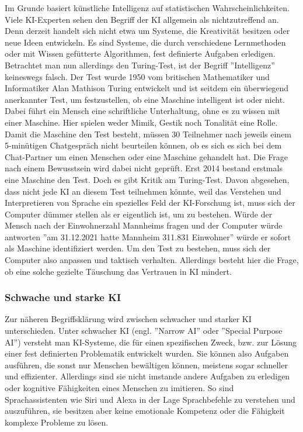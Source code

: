\documentclass[a4paper,12pt, german]{report}
\begin{document}
Im Grunde basiert künstliche Intelligenz auf statistischen Wahrscheinlichkeiten. Viele KI-Experten sehen den Begriff der KI allgemein als nichtzutreffend an. Denn derzeit handelt sich nicht etwa um Systeme, die Kreativität besitzen oder neue Ideen entwickeln. Es sind Systeme, die durch verschiedene Lernmethoden oder mit Wissen gefütterte Algorithmen, fest definierte Aufgaben erledigen. \newline
Betrachtet man nun allerdings den Turing-Test, ist der Begriff ''Intelligenz'' keineswegs falsch. Der Test wurde 1950 vom britischen Mathematiker und Informatiker Alan Mathison Turing entwickelt und ist seitdem ein überwiegend anerkannter Test, um festzustellen, ob eine Maschine intelligent ist oder nicht.
Dabei führt ein Mensch eine schriftliche Unterhaltung, ohne es zu wissen mit einer Maschine. Hier spielen weder Mimik, Gestik noch Tonalität eine Rolle. Damit die Maschine den Test besteht, müssen 30 Teilnehmer nach jeweils einem 5-minütigen Chatgespräch nicht beurteilen können, ob es sich es sich bei dem Chat-Partner um einen Menschen oder eine Maschine gehandelt hat. Die Frage nach einem Bewusstsein wird dabei nicht geprüft. Erst 2014 bestand erstmals eine Maschine den Test. \newline
Doch es gibt Kritik am Turing-Test. Davon abgesehen, dass nicht jede KI an diesem Test teilnehmen könnte, weil das Verstehen und Interpretieren von Sprache ein spezielles Feld der KI-Forschung ist, muss sich der Computer dümmer stellen als er eigentlich ist, um zu bestehen. Würde der Mensch nach der Einwohnerzahl Mannheims fragen und der Computer würde antworten ''am 31.12.2021 hatte Mannheim 311.831 Einwohner'' würde er sofort als Maschine identifiziert werden. Um den Test zu bestehen, muss sich der Computer also anpassen und taktisch verhalten. Allerdings besteht hier die Frage, ob eine solche gezielte Täuschung das Vertrauen in KI mindert.\cite{02}

\subsubsection{Schwache und starke KI}


Zur näheren Begriffsklärung wird zwischen schwacher und starker KI unterschieden. Unter schwacher KI (engl. ''Narrow AI'' oder ''Special Purpose AI'') versteht man KI-Systeme, die für einen spezifischen Zweck, bzw. zur Lösung einer fest definierten Problematik entwickelt wurden. Sie können also Aufgaben ausführen, die sonst nur Menschen bewältigen können, meistens sogar schneller und effizienter. Allerdings sind sie nicht imstande andere Aufgaben zu erledigen oder kognitive Fähigkeiten eines Menschen zu imitieren. So sind Sprachassistenten wie Siri und Alexa in der Lage Sprachbefehle zu verstehen und auszuführen, sie besitzen aber keine emotionale Kompetenz oder die Fähigkeit komplexe Probleme zu lösen. \cite{01}\cite{15}
\end{document}
